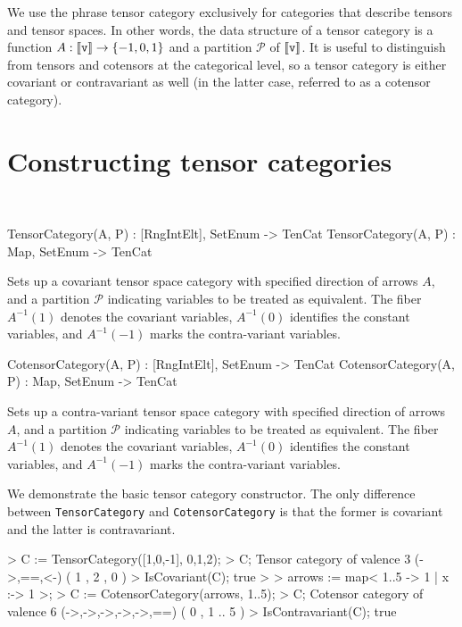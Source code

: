 We use the phrase tensor category exclusively for categories that describe tensors and tensor spaces.
In other words, the data structure of a tensor category is a function 
$A:\llbracket \operatorname{\mathtt{v}}\rrbracket\rightarrow \{-1,0,1\}$ and a partition $\mathcal{P}$ of $\llbracket \operatorname{\mathtt{v}}\rrbracket$.
It is useful to distinguish from tensors and cotensors at the categorical level,
so a tensor category is either covariant or contravariant as well 
(in the latter case, referred to as a cotensor category).

\section{Constructing tensor categories}~

\begin{intrinsics}
TensorCategory(A, P) : [RngIntElt], {SetEnum} -> TenCat
TensorCategory(A, P) : Map, {SetEnum} -> TenCat
\end{intrinsics}

Sets up a covariant tensor space category with specified direction of
arrows $A$, and a partition $\mathcal{P}$ indicating variables to be treated as
equivalent.  The fiber $A^{-1}(1)$ denotes the covariant variables,
$A^{-1}(0)$ identifies the constant variables, and $A^{-1}(-1)$ marks
the contra-variant variables.  

\begin{intrinsics}
CotensorCategory(A, P) : [RngIntElt], {SetEnum} -> TenCat
CotensorCategory(A, P) : Map, {SetEnum} -> TenCat
\end{intrinsics}

Sets up a contra-variant tensor space category with specified direction of
arrows $A$, and a partition $\mathcal{P}$ indicating variables to be treated as
equivalent.  The fiber $A^{-1}(1)$ denotes the covariant variables,
$A^{-1}(0)$ identifies the constant variables, and $A^{-1}(-1)$ marks
the contra-variant variables.  

\begin{example}[BasicCatConst]

We demonstrate the basic tensor category constructor. The only difference
between \texttt{TensorCategory} and \texttt{CotensorCategory} is that the former
is covariant and the latter is contravariant.
\begin{code}
> C := TensorCategory([1,0,-1], {{0},{1},{2}});
> C;
Tensor category of valence 3 (->,==,<-) ({ 1 },{ 2 },{ 0 })
> IsCovariant(C);
true
> 
> arrows := map< {1..5} -> {1} | x :-> 1 >;
> C := CotensorCategory(arrows, {{1..5}});
> C;
Cotensor category of valence 6 (->,->,->,->,->,==) ({ 0 },{ 1 .. 5 })
> IsContravariant(C);
true
\end{code}
\end{example}


